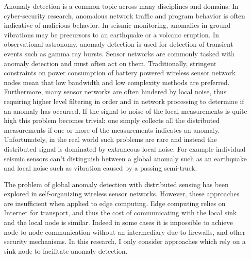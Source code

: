 Anomaly detection is a common topic across many disciplines and domains.
In cyber-security research, anomalous network traffic and program behavior is often indicative of malicious behavior.
In seismic monitoring, anomalies in ground vibrations may be precursors to an earthquake or a volcano eruption.
In observational astronomy, anomaly detection is used for detection of transient events such as gamma ray bursts.
Sensor networks are commonly tasked with anomaly detection and must often act on them.
Traditionally, stringent constraints on power consumption of battery powered wireless sensor network nodes mean that low bandwidth and low complexity methods are preferred.
Furthermore, many sensor networks are often hindered by local noise, thus requiring higher level filtering in order and in network processing to determine if an anomaly has occurred.
If the signal to noise of the local measurements is quite high this problem becomes trivial: one simply collects all the distributed measurements if one or more of the measurements indicates an anomaly.
Unfortunately, in the real world such problems are rare and instead the distributed signal is dominated by extraneous local noise.
For example individual seismic sensors can't distinguish between a global anomaly such as an earthquake and local noise such as vibration caused by a passing semi-truck.


The problem of global anomaly detection with distributed sensing has been explored in self-organizing wireless sensor networks.
However, these approaches are insufficient when applied to edge computing.
Edge computing relies on Internet for transport, and thus the cost of communicating with the local sink and the local node is similar.
Indeed in some cases it is impossible to achieve node-to-node communication without an intermediary due to firewalls, and other security mechanisms.
In this research, I only consider approaches which rely on a sink node to facilitate anomaly detection.

